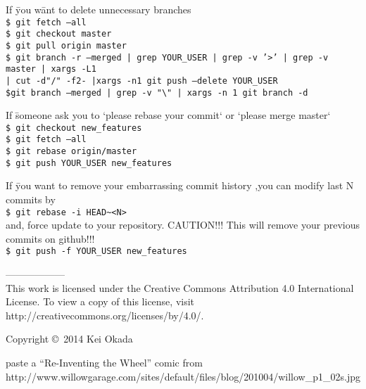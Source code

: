 \documentclass[10pt,landscape]{article}
\begin{document}
\begin{multicols}{2}
\begin{tabbing}
If \=you w\=ant to delete unnecessary branches\\
\> \texttt{\$ git fetch --all}\\
\> \texttt{\$ git checkout master}\\
\> \texttt{\$ git pull origin master}\\
\> \texttt{\$ git branch -r --merged |  grep YOUR\_USER |  grep -v '>' |  grep -v master |  xargs -L1}\\
\>\> \texttt{|  cut -d"/" -f2- |xargs -n1 git push --delete YOUR\_USER}\\
\> \texttt{\$git branch --merged | grep -v "\textbackslash *" | xargs -n 1 git branch -d}\\
\end{tabbing}

\begin{tabbing}
If \=someone ask you to `please rebase your commit` or `please merge master`\\
\> \texttt{\$ git checkout new\_features}\\  
\> \texttt{\$ git fetch --all}\\
\> \texttt{\$ git rebase origin/master}\\
\> \texttt{\$ git push YOUR\_USER new\_features}\\  
\end{tabbing}

\begin{tabbing}
If \=you want to remove your embarrassing commit history %
,you can modify last N commits by\\
\> \texttt{\$ git rebase -i HEAD\textasciitilde<N>}\\
and, force update to your repository. CAUTION!!! This will remove your
previous commits on github!!!\\
\> \texttt{\$ git push -f YOUR\_USER new\_features}\\  
\end{tabbing}
------------------\\
\scriptsize
This work is licensed under the Creative Commons Attribution 4.0
International License. To view a copy of this license, visit
http://creativecommons.org/licenses/by/4.0/.

Copyright \copyright\ 2014 Kei Okada

\end{multicols}
\newpage

\begin{center}
paste a ``Re-Inventing the Wheel'' comic from
http://www.willowgarage.com/sites/default/files/blog/201004/willow\_p1\_02s.jpg
\end{center}
\end{document}
